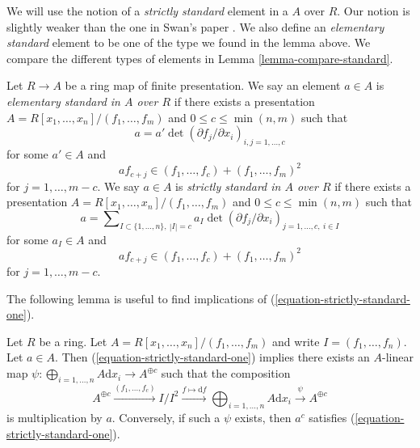 \noindent
We will use the notion of a {\it strictly standard} element in
a $A$ over $R$. Our notion is slightly weaker than the
one in Swan's paper \cite{swan}. We also define an {\it elementary
standard} element to be one of the type we found in the lemma above.
We compare the different types of elements in
Lemma \ref{lemma-compare-standard}.

\begin{definition}
\label{definition-strictly-standard}
Let $R \to A$ be a ring map of finite presentation.
We say an element $a \in A$ is {\it elementary standard in $A$ over $R$}
if there exists a presentation
$A = R[x_1, \ldots, x_n]/(f_1, \ldots, f_m)$
and $0 \leq c \leq \min(n, m)$ such that
\begin{equation}
\label{equation-elementary-standard-one}
a = a' \det(\partial f_j/\partial x_i)_{i, j = 1, \ldots, c}
\end{equation}
for some $a' \in A$ and
\begin{equation}
\label{equation-elementary-standard-two}
a f_{c + j} \in (f_1, \ldots, f_c) + (f_1, \ldots, f_m)^2
\end{equation}
for $j = 1, \ldots, m - c$. We say $a \in A$ is
{\it strictly standard in $A$ over $R$} if there exists a presentation
$A = R[x_1, \ldots, x_n]/(f_1, \ldots, f_m)$
and $0 \leq c \leq \min(n, m)$ such that
\begin{equation}
\label{equation-strictly-standard-one}
a = \sum\nolimits_{I \subset \{1, \ldots, n\},\ |I| = c}
a_I \det(\partial f_j/\partial x_i)_{j = 1, \ldots, c,\ i \in I}
\end{equation}
for some $a_I \in A$ and
\begin{equation}
\label{equation-strictly-standard-two}
a f_{c + j} \in (f_1, \ldots, f_c) + (f_1, \ldots, f_m)^2
\end{equation}
for $j = 1, \ldots, m - c$.
\end{definition}

\noindent
The following lemma is useful to find implications of
(\ref{equation-strictly-standard-one}).

\begin{lemma}
\label{lemma-parse-equation-strictly-standard-one}
Let $R$ be a ring. Let $A = R[x_1, \ldots, x_n]/(f_1, \ldots, f_m)$
and write $I = (f_1, \ldots, f_n)$. Let $a \in A$. Then
(\ref{equation-strictly-standard-one}) implies
there exists an $A$-linear map
$\psi : \bigoplus\nolimits_{i = 1, \ldots, n} A \text{d}x_i \to A^{\oplus c}$
such that the composition
$$
A^{\oplus c} \xrightarrow{(f_1, \ldots, f_c)}
I/I^2 \xrightarrow{f \mapsto \text{d}f}
\bigoplus\nolimits_{i = 1, \ldots, n} A \text{d}x_i
\xrightarrow{\psi}
A^{\oplus c}
$$
is multiplication by $a$. Conversely, if such a $\psi$ exists, then
$a^c$ satisfies (\ref{equation-strictly-standard-one}).
\end{lemma}

